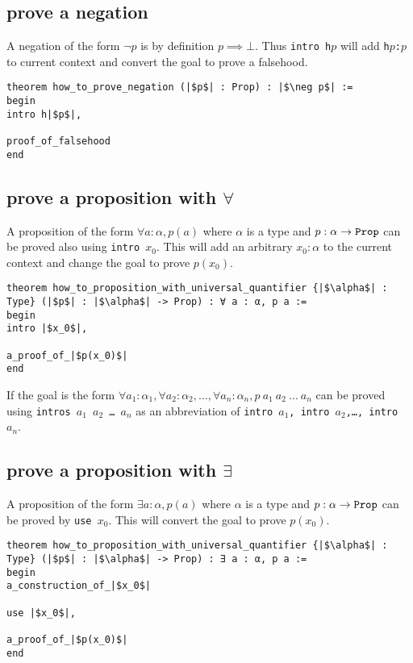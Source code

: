 \documentclass{report}
\theoremstyle{definition}
\theoremstyle{plain}
\begin{document}
\subsection{prove a negation}
A negation of the form $\neg p$ is by definition $p \implies \bot$. Thus {\tt intro h$p$} will add {\tt h$p$:$p$} to current context and convert the goal to prove a falsehood.

\begin{verbatim}
theorem how_to_prove_negation (|$p$| : Prop) : |$\neg p$| :=
begin
intro h|$p$|,

proof_of_falsehood
end
\end{verbatim}

\subsection{prove a proposition with $\forall$}\label{lean:forall}
A proposition of the form $\forall a : \alpha, p(a)$ where $\alpha$ is a type and $p : \alpha\to {\tt Prop}$ can be proved also using {\tt intro $x_0$}. This will add an arbitrary $x_0:\alpha$ to the current context and change the goal to prove $p(x_0)$.

\begin{verbatim}
theorem how_to_proposition_with_universal_quantifier {|$\alpha$| : Type} (|$p$| : |$\alpha$| -> Prop) : ∀ a : α, p a :=
begin
intro |$x_0$|,

a_proof_of_|$p(x_0)$|
end
\end{verbatim}

If the goal is the form $\forall a_1:\alpha_1,\forall a_2:\alpha_2,\dots,\forall a_n:\alpha_n, p\ a_1\ a_2\ \dots\ a_n$ can be proved using {\tt intros $a_1$ $a_2$ \dots\  $a_n$} as an abbreviation of {\tt intro $a_1$, intro $a_2$,\dots, intro $a_n$}.

\subsection{prove a proposition with $\exists$}\label{lean:exists}
A proposition of the form $\exists a:\alpha, p(a)$ where $\alpha$ is a type and $p : \alpha\to {\tt Prop}$ can be proved by {\tt use $x_0$}. This will convert the goal to prove $p(x_0)$.

\begin{verbatim}
theorem how_to_proposition_with_universal_quantifier {|$\alpha$| : Type} (|$p$| : |$\alpha$| -> Prop) : ∃ a : α, p a :=
begin
a_construction_of_|$x_0$|

use |$x_0$|,
  
a_proof_of_|$p(x_0)$|
end
\end{verbatim}
\end{document}
